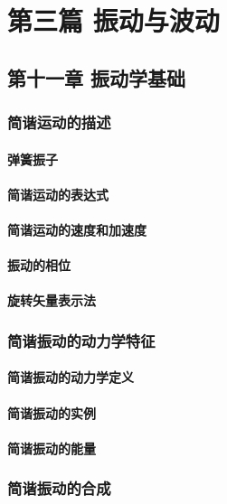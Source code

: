 \part{第三篇 振动与波动}
\setcounter{chapter}{10}
\chapter{第十一章 振动学基础}

\section{简谐运动的描述}
    \subsection{弹簧振子}
    \subsection{简谐运动的表达式}
    \subsection{简谐运动的速度和加速度}
    \subsection{振动的相位}
    \subsection{旋转矢量表示法}

\section{简谐振动的动力学特征}
    \subsection{简谐振动的动力学定义}
    \subsection{简谐振动的实例}
    \subsection{简谐振动的能量}

\section{简谐振动的合成}
